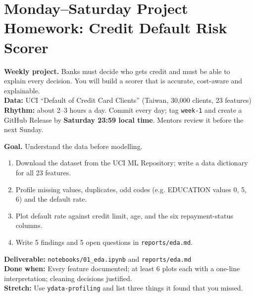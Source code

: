 \clearpage
\section*{Monday--Saturday Project Homework: Credit Default Risk Scorer}
\begin{tcolorbox}[enhanced,colback=navy,colframe=gold,boxrule=0.8pt,arc=3pt,coltext=white,left=8pt,right=8pt,top=6pt,bottom=6pt]
{\color{gold}\bfseries Weekly project.} Banks must decide who gets credit and must be able to explain every decision. You will build a scorer that is accurate, cost-aware and explainable.\\[3pt]
{\color{gold}\bfseries Data:} UCI ``Default of Credit Card Clients'' (Taiwan, 30,000 clients, 23 features)\\[3pt]
{\color{gold}\bfseries Rhythm:} about 2--3 hours a day. Commit every day; tag \texttt{week-1} and create a GitHub Release by \textbf{Saturday 23:59 local time}. Mentors review it before the next Sunday.
\end{tcolorbox}

\begin{tcolorbox}[enhanced,breakable,colback=white,colframe=sun,boxrule=0.8pt,arc=2pt,left=7pt,right=7pt,top=4pt,bottom=4pt,
  title={\bfseries Monday --- Exploratory data analysis report\hfill\normalfont\small 2--3 h},coltitle=white,colbacktitle=sun,fonttitle=\small]
\textbf{Goal.} Understand the data before modelling.
\begin{enumerate}[itemsep=1pt,topsep=2pt]
  \item Download the dataset from the UCI ML Repository; write a data dictionary for all 23 features.
  \item Profile missing values, duplicates, odd codes (e.g. EDUCATION values 0, 5, 6) and the default rate.
  \item Plot default rate against credit limit, age, and the six repayment-status columns.
  \item Write 5 findings and 5 open questions in \texttt{reports/eda.md}.
\end{enumerate}
\textbf{\color{dataC}Deliverable:} \texttt{notebooks/01\_eda.ipynb} and \texttt{reports/eda.md}\\
\textbf{\color{navy}Done when:} Every feature documented; at least 6 plots each with a one-line interpretation; cleaning decisions justified.\\
\textbf{\color{skillC}Stretch:} Use \texttt{ydata-profiling} and list three things it found that you missed.
\end{tcolorbox}

